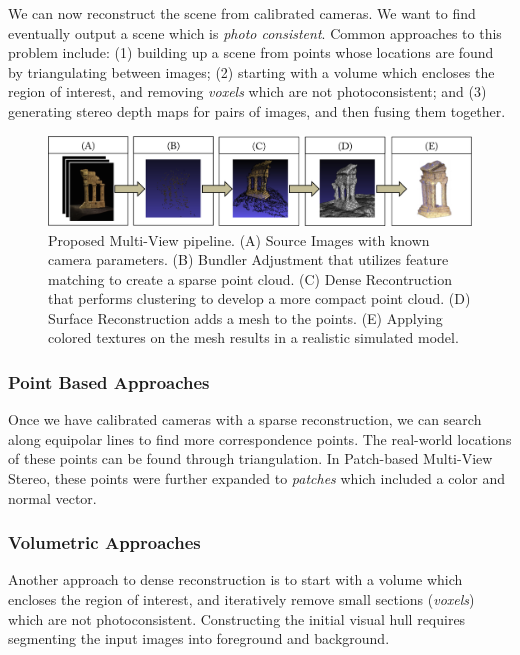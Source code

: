 \documentclass[10pt,twocolumn,letterpaper]{article}
\begin{document}
We can now reconstruct the scene from calibrated cameras. We want to find eventually output a scene which is \emph{photo consistent}. Common approaches to this problem include: (1) building up a scene from points whose locations are found by triangulating between images; (2) starting with a volume which encloses the region of interest, and removing \emph{voxels} which are not photoconsistent; and (3) generating stereo depth maps for pairs of images, and then fusing them together.\cite{furukawa}

\begin{figure}[t]
  \begin{center}
    \includegraphics[width=\linewidth]{pipeline3.png}
  \end{center}
  \caption{Proposed Multi-View pipeline. (A) Source Images with known camera parameters. (B) Bundler Adjustment that utilizes feature matching to create a sparse point cloud. (C) Dense Recontruction that performs clustering to develop a more compact point cloud. (D) Surface Reconstruction adds a mesh to the points. (E) Applying colored textures on the mesh results in a realistic simulated model.}
  \label{fig:short}
\end{figure}

\subsubsection{Point Based Approaches}

Once we have calibrated cameras with a sparse reconstruction, we can search along equipolar lines to find more correspondence points. The real-world locations of these points can be found through triangulation. In Patch-based Multi-View Stereo, these points were further expanded to \emph{patches} which included a color and normal vector.\cite{furukawa}

\subsubsection{Volumetric Approaches}

Another approach to dense reconstruction is to start with a volume which encloses the region of interest, and iteratively remove small sections (\emph{voxels}) which are not photoconsistent. Constructing the initial visual hull requires segmenting the input images into foreground and background.\cite{spacecarving}
\end{document}
